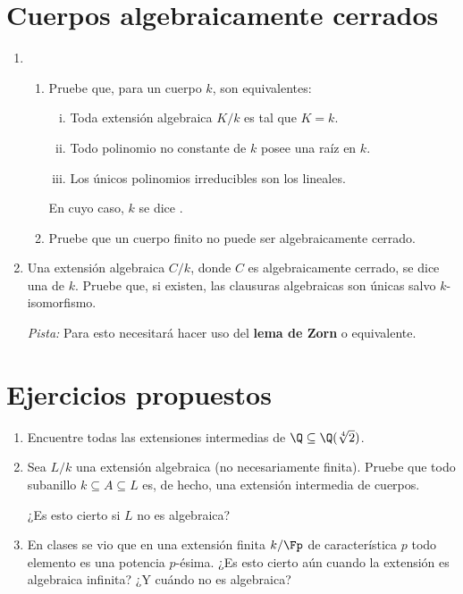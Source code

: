 \documentclass[11pt, reqno]{amsart}
\begin{document}
\section{Cuerpos algebraicamente cerrados}
\begin{enumerate}[resume]
	\item \begin{enumerate}
			\item Pruebe que, para un cuerpo $k$, son equivalentes:
				\begin{enumerate}[(i)]
					\item Toda extensión algebraica $K/k$ es tal que $K = k$.
					\item Todo polinomio no constante de $k$ posee una raíz en $k$.
					\item Los únicos polinomios irreducibles son los lineales.
				\end{enumerate}
				En cuyo caso, $k$ se dice .
			\item Pruebe que un cuerpo finito no puede ser algebraicamente cerrado.
		\end{enumerate}

	\item\lookright
		Una extensión algebraica $C/k$, donde $C$ es algebraicamente cerrado, se dice una  de $k$.
		Pruebe que, si existen, las clausuras algebraicas son únicas salvo $k$-isomorfismo.

		\emph{Pista:}
		Para esto necesitará hacer uso del \textbf{lema de Zorn} o equivalente.
\end{enumerate}

\appendix
\section{Ejercicios propuestos}
\begin{enumerate}
	\item \lookright
		Encuentre todas las extensiones intermedias de $\Q \subseteq \Q(\sqrt[4]{2})$.

	\item Sea $L/k$ una extensión algebraica (no necesariamente finita).
		Pruebe que todo subanillo $k \subseteq A \subseteq L$ es, de hecho, una extensión intermedia de cuerpos.

		\lookup
		¿Es esto cierto si $L$ no es algebraica?

	\item En clases se vio que en una extensión finita $k/\Fp$ de característica $p$ todo elemento es una potencia $p$-ésima.
		¿Es esto cierto aún cuando la extensión es algebraica infinita?
		¿Y cuándo no es algebraica?
\end{enumerate}
\end{document}
